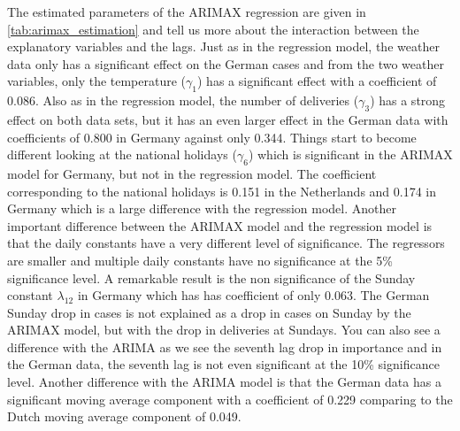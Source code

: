 The estimated parameters of the ARIMAX regression are given in \autoref{tab:arimax_estimation} and tell us more about the interaction between the explanatory variables and the lags. Just as in the regression model, the weather data only has a significant effect on the German cases and from the two weather variables, only the temperature ($\gamma_1$) has a significant effect with a coefficient of 0.086. Also as in the regression model, the number of deliveries ($\gamma_3$) has a strong effect on both data sets, but it has an even larger effect in the German data with coefficients of 0.800 in Germany against only 0.344. Things start to become different looking at the national holidays ($\gamma_6$) which is significant in the ARIMAX model for Germany, but not in the regression model. The coefficient corresponding to the national holidays is 0.151 in the Netherlands and 0.174 in Germany which is a large difference with the regression model. Another important difference between the ARIMAX model and the regression model is that the daily constants have a very different level of significance. The regressors are smaller and multiple daily constants have no significance at the 5\% significance level. A remarkable result is the non significance of the Sunday constant $\lambda_{12}$ in Germany which has has coefficient of only 0.063. The German Sunday drop in cases is not explained as a drop in cases on Sunday by the ARIMAX model, but with the drop in deliveries at Sundays. You can also see a difference with the ARIMA as we see the seventh lag drop in importance and in the German data, the seventh lag is not even significant at the 10\% significance level. Another difference with the ARIMA model is that the German data has a significant moving average component with a coefficient of 0.229 comparing to the Dutch moving average component of 0.049.\\

